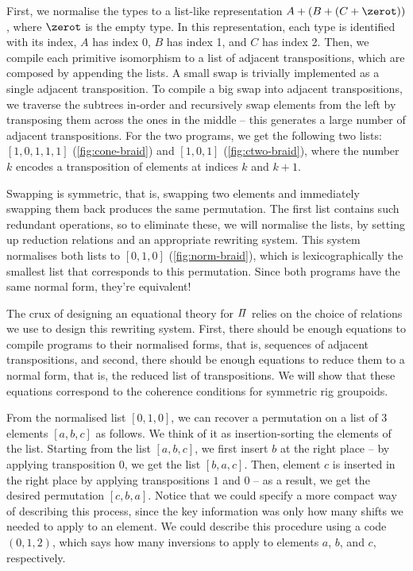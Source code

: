 First, we normalise the types to a list-like representation $A + (B + (C + \zerot))$, where $\zerot$ is the empty type.
In this representation, each type is identified with its index, $A$ has index 0, $B$ has index 1, and $C$ has index 2.
Then, we compile each primitive isomorphism to a list of adjacent transpositions, which are composed by appending the
lists. A small swap is trivially implemented as a single adjacent transposition. To compile a big swap into adjacent
transpositions, we traverse the subtrees in-order and recursively swap elements from the left by transposing them across
the ones in the middle -- this generates a large number of adjacent transpositions. For the two programs, we get the
following two lists: $[1,0,1,1,1]$ (\cref{fig:cone-braid}) and $[1,0,1]$ (\cref{fig:ctwo-braid}), where the number $k$
encodes a transposition of elements at indices $k$ and $k+1$.

Swapping is symmetric, that is, swapping two elements and immediately swapping them back produces the same permutation.
The first list contains such redundant operations, so to eliminate these, we will normalise the lists, by setting up
reduction relations and an appropriate rewriting system. This system normalises both lists to $[0,1,0]$
(\cref{fig:norm-braid}), which is lexicographically the smallest list that corresponds to this permutation. Since both
programs have the same normal form, they're equivalent!

The crux of designing an equational theory for $\mathit{\Pi}$ relies on the choice of relations we use to design this
rewriting system. First, there should be enough equations to compile programs to their normalised forms, that is,
sequences of adjacent transpositions, and second, there should be enough equations to reduce them to a normal form, that
is, the reduced list of transpositions. We will show that these equations correspond to the coherence conditions for
symmetric rig groupoids.

From the normalised list $[0,1,0]$, we can recover a permutation on a list of 3 elements $[a,b,c]$ as follows. We think
of it as insertion-sorting the elements of the list. Starting from the list $[a, b, c]$, we first insert $b$ at the
right place -- by applying transposition $0$, we get the list $[b, a, c]$. Then, element $c$ is inserted in the right
place by applying transpositions $1$ and $0$ -- as a result, we get the desired permutation $[c, b, a]$. Notice that we
could specify a more compact way of describing this process, since the key information was only how many shifts we
needed to apply to an element. We could describe this procedure using a code $(0, 1, 2)$, which says how many inversions
to apply to elements $a$, $b$, and $c$, respectively.

